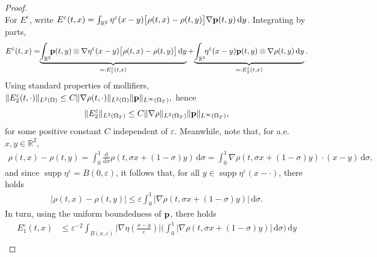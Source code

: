 \documentclass[11pt,a4paper,reqno]{amsart}
\theoremstyle{remark}
\theoremstyle{definition}
\numberwithin{equation}{section}
\newcommand{\RR}{\mathbb{R}}
\newcommand{\p}{{\bf p}}
\renewcommand{\d}{\, \mathrm{d} }
\newcommand{\der}{\mathrm{d}}
\DeclareMathOperator{\supp}{\mathrm{supp}}
\begin{document}
\begin{proof}
\begin{equation}
\end{equation}
For $E^\varepsilon$, write $E^\varepsilon(t,x) = \int_{\mathbb{R}^2} \eta^\varepsilon(x-y)\big[ \rho(t,x)-\rho(t,y) \big]\nabla\p(t,y) \d y$. Integrating by parts, 
\begin{equation*}
   \begin{aligned}
       E^\varepsilon(t,x) =\!\!  \underbrace{\int_{\mathbb{R}^2} \!\!\p(t,y) \otimes \nabla \eta^\varepsilon(x-y) \big[ \rho(t,x)-\rho(t,y) \big] \d y}_{=: E^\varepsilon_1(t,x)} + \!\underbrace{\int_{\mathbb{R}^2} \!\!\eta^\varepsilon(x-y) \p(t,y) \otimes \nabla \rho(t,y) \d y}_{=: E^\varepsilon_2(t,x)} . 
   \end{aligned} 
\end{equation*}
Using standard properties of mollifiers, $\Vert E^\varepsilon_2(t,\cdot) \Vert_{L^2(\Omega)} \leq C \Vert \nabla \rho(t,\cdot) \Vert_{L^2(\Omega)} \Vert \p \Vert_{L^\infty(\Omega_T)},$ hence 
\begin{equation}\label{eq:Eeps2 bound unif}
    \Vert E^\varepsilon_2 \Vert_{L^2(\Omega_T)} \leq C \Vert \nabla \rho \Vert_{L^2(\Omega_T)} \Vert \p \Vert_{L^\infty(\Omega_T)}, 
\end{equation}
for some positive constant $C$ independent of $\varepsilon$. Meanwhile, note that, for a.e.~$x,y\in \RR^2$,
\begin{equation*}
   \begin{aligned} 
  \rho(t,x)-\rho(t,y) = \int_0^1 \frac{\der}{\der \sigma}\rho(t,\sigma x +(1-\sigma)y)  \d \sigma = \int_0^1 \nabla \rho(t,\sigma x +(1-\sigma)y) \!\cdot\! (x-y)  \d \sigma, 
   \end{aligned}
\end{equation*}
and since $\supp \eta^\varepsilon = B(0,\varepsilon)$, it follows that, for all $y \in \supp \eta^\varepsilon(x-\cdot)$, there holds 
\begin{equation}\label{eq:rho diff for mollification argument}
   \begin{aligned} 
  |\rho(t,x)-\rho(t,y)| \leq \varepsilon \int_0^1 |\nabla \rho(t,\sigma x +(1-\sigma)y)| \d \sigma. 
   \end{aligned}
\end{equation}
In turn, using the uniform boundedness of $\p$, there holds 
\begin{equation*}
    \begin{aligned}
        E^\varepsilon_1(t,x) &\leq \varepsilon^{-2} \int_{B(x,\varepsilon)} \big|\nabla \eta(\frac{x-y}{\varepsilon}) \big| \bigg(  \int_0^1 |\nabla \rho(t,\sigma x +(1-\sigma)y)| \d \sigma\bigg) \d y \\ 

\end{aligned}
\end{equation*}
\end{proof}
\end{document}
